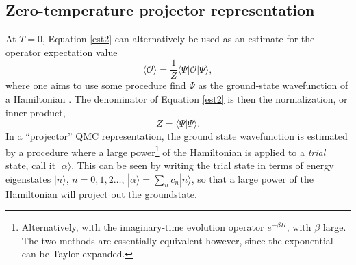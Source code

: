 \documentclass[vecphys]{svmult}
\begin{document}
\subsection{Zero-temperature projector representation} \label{secT0}

At $T=0$, Equation \ref{est2} can alternatively be used as an estimate for the operator expectation value
\begin{equation}
\langle \mathcal{O} \rangle  = \frac{1}{Z} \langle \Psi | \mathcal{O} | \Psi \rangle, \label{zeroExpet}
\end{equation}
where one aims to use some procedure find $\Psi$ as the ground-state wavefunction of a Hamiltonian \cite{Melko:Sandvik05}.  
The denominator of Equation \ref{est2} is then the normalization, or inner product,
\begin{equation}
Z =  \langle \Psi | \Psi \rangle.
\end{equation}
In a ``projector'' QMC representation, the ground state wavefunction is estimated by a procedure where a large power\footnote{Alternatively, with the imaginary-time evolution operator $e^{-\beta H}$, with $\beta$ large.  The two methods are essentially equivalent however, since the exponential can be Taylor expanded.} of the Hamiltonian is applied to a {\it trial} state, call it $|\alpha \rangle$.  This can be seen by writing the trial state in terms of energy eigenstates $|n \rangle$, $n=0,1,2 \ldots$,
$|\alpha \rangle= \sum_n c_n |n \rangle$, so that 
a large power of the Hamiltonian will project out the groundstate.  
\end{document}
